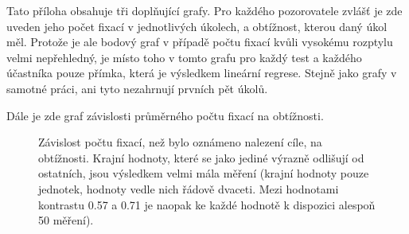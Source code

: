 

Tato příloha obsahuje tři doplňující grafy. Pro každého pozorovatele zvlášť je
zde uveden jeho počet fixací v jednotlivých úkolech, a obtížnost, kterou daný
úkol měl. Protože je ale bodový graf v případě počtu
fixací kvůli vysokému rozptylu velmi nepřehledný, je místo toho v tomto grafu
pro každý test a každého účastníka pouze přímka, která je výsledkem lineární regrese. Stejně jako grafy v samotné práci, ani tyto nezahrnují prvních pět úkolů. 

Dále je zde graf závislosti průměrného počtu fixací na obtížnosti.

\def\graphfigure#1#2#3{
\begin{figure}[h!]
\centering
\caption{#2}
\label{#3}
\end{figure}
}

\graphfigure{Kontrast_fix}{Závislost počtu fixací, než bylo oznámeno nalezení
cíle, na obtížnosti. Krajní hodnoty, které se jako jediné výrazně odlišují od
ostatních, jsou výsledkem velmi mála měření (krajní hodnoty pouze
jednotek, hodnoty vedle nich řádově dvaceti. Mezi hodnotami kontrastu 0.57 a
0.71 je naopak ke každé hodnotě k dispozici alespoň 50 měření). }{kontr}

